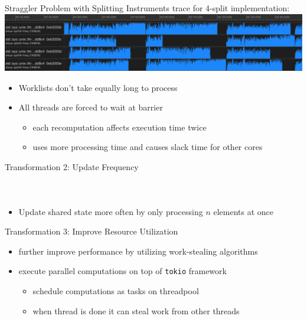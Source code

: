 \documentclass[aspectratio=169, usenames, dvipsnames]{beamer}
\begin{document}
\begin{frame}{Straggler Problem with Splitting}
  Instruments trace for 4-split implementation:
  \includegraphics[width=\textwidth,keepaspectratio]{img/cpu_load_split.png}

  \vfill
  \begin{itemize}
    \item<2-> Worklists don't take equally long to process
    \item<3-> All threads are forced to wait at barrier
    \begin{itemize}
      \item<4-> each recomputation affects execution time twice
      \item<4-> uses more processing time and causes slack time for other cores
    \end{itemize}
  \end{itemize}
\end{frame}

\begin{frame}{Transformation 2: Update Frequency}
  \begin{columns}
    \begin{column}{.5\textwidth}
      \inputminted[bgcolor=rustcolor, fontsize=\tiny]{rust}{code/split.rs}
    \end{column}
    \begin{column}{.5\textwidth}
    \end{column}
  \end{columns}%
  \begin{itemize}
    \item<2-> Update shared state more often by only processing $n$ elements at once
  \end{itemize}
  \vfill
\end{frame}

\begin{frame}{Transformation 3: Improve Resource Utilization}
  \begin{itemize}
    \item further improve performance by utilizing work-stealing algorithms\\[\baselineskip]
    \item execute parallel computations on top of \texttt{tokio} framework
    \begin{itemize}
      \item<2-> schedule computations as tasks on threadpool
      \item<3-> when thread is done it can steal work from other threads
    \end{itemize}
  \end{itemize}
\end{frame}
\end{document}
